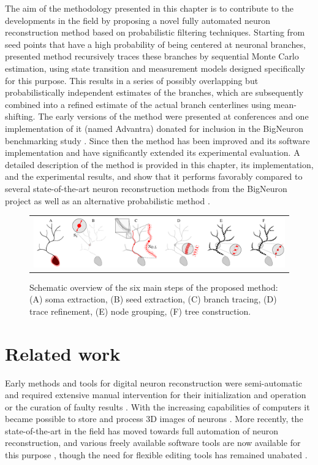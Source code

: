 The aim of the methodology presented in this chapter is to contribute to the developments in the field by proposing a novel fully automated neuron reconstruction method based on probabilistic filtering techniques. Starting from seed points that have a high probability of being centered at neuronal branches, presented method recursively traces these branches by sequential Monte Carlo estimation, using state transition and measurement models designed specifically for this purpose. This results in a series of possibly overlapping but probabilistically independent estimates of the branches, which are subsequently combined into a refined estimate of the actual branch centerlines using mean-shifting. The early versions of the method were presented at conferences \cite{radojevic2015automated, radojevic2017neuron} and one implementation of it (named Advantra) donated for inclusion in the BigNeuron benchmarking study \cite{peng2015bigneuron, peng2015diadem}. Since then the method has been improved and its software implementation and have significantly extended its experimental evaluation. A detailed description of the method is provided in this chapter, its implementation, and the experimental results, and show that it performs favorably compared to several state-of-the-art neuron reconstruction methods from the BigNeuron project as well as an alternative probabilistic method \cite{radojevic2017automated}.
\begin{figure}
	\begin{tabular}{c}
		\includegraphics[width=\textwidth]{fig1}
	\end{tabular}
	\caption{Schematic overview of the six main steps of the proposed method: (A) soma extraction, (B) seed extraction, (C) branch tracing, (D) trace refinement, (E) node grouping, (F) tree construction.}
	\label{ch4_fig1}
\end{figure}
\section{Related work}
\label{sec:related-work}
Early methods and tools for digital neuron reconstruction were semi-automatic and required extensive manual intervention for their initialization and operation or the curation of faulty results \cite{glaser1965semi, capowski1981accurate, glaser1990neuron, masseroli1993quantitative}. With the increasing capabilities of computers it became possible to store and process 3D images of neurons \cite{cohen1994automated, belichenko1995confocal}. More recently, the state-of-the-art in the field has moved towards full automation of neuron reconstruction, and various freely available software tools are now available for this purpose \cite{peng2010v3d, longair2011simple, peng2014extensible, peng2014virtual}, though the need for flexible editing tools has remained unabated \cite{luisi2011farsight, dercksen2014filament}.

